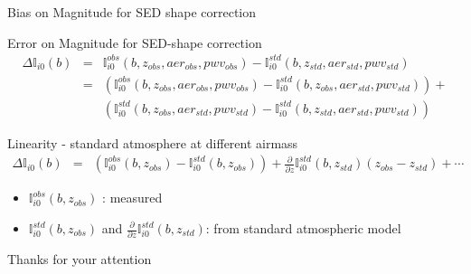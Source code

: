 \documentclass{beamer}
\begin{document}
\begin{frame}{Bias on Magnitude for SED shape correction}
\begin{block}{Error on Magnitude for SED-shape correction}
\begin{eqnarray}
\Delta \mathbb{I}_{i0}(b) & = &  \mathbb{I}_{i0}^{obs}(b,z_{obs},aer_{obs},pwv_{obs}) - \mathbb{I}_{i0}^{std}(b,z_{std},aer_{std},pwv_{std}) \nonumber \\
& = & \left(\mathbb{I}_{i0}^{obs}(b,z_{obs},aer_{obs},pwv_{obs}) - \mathbb{I}_{i0}^{std}(b,z_{obs},aer_{std},pwv_{std})\right) +  \nonumber \\
& & \left(\mathbb{I}_{i0}^{std}(b,z_{obs},aer_{std},pwv_{std}) - \mathbb{I}_{i0}^{std}(b,z_{std},aer_{std},pwv_{std})\right)  \nonumber 
\end{eqnarray}
\end{block}

\begin{alertblock}{Linearity - standard atmosphere at different airmass}
\begin{eqnarray}
\Delta \mathbb{I}_{i0}(b) & = & \left(\mathbb{I}_{i0}^{obs}(b,z_{obs}) - \mathbb{I}_{i0}^{std}(b,z_{obs})\right) + \frac{\partial}{\partial z}\mathbb{I}_{i0}^{std}(b,z_{std})(z_{obs}-z_{std}) + \cdots \nonumber
\end{eqnarray}
\end{alertblock}
\begin{itemize}
\item $\mathbb{I}_{i0}^{obs}(b,z_{obs})$ : measured
\item $\mathbb{I}_{i0}^{std}(b,z_{obs})$ and $\frac{\partial}{\partial z}\mathbb{I}_{i0}^{std}(b,z_{std})$: from standard atmospheric model
\end{itemize}
\end{frame}



\begin{frame}
\begin{center}
{

\LARGE \alert{Thanks for your attention}}

\end{center}

\end{frame}

 
\end{document}
